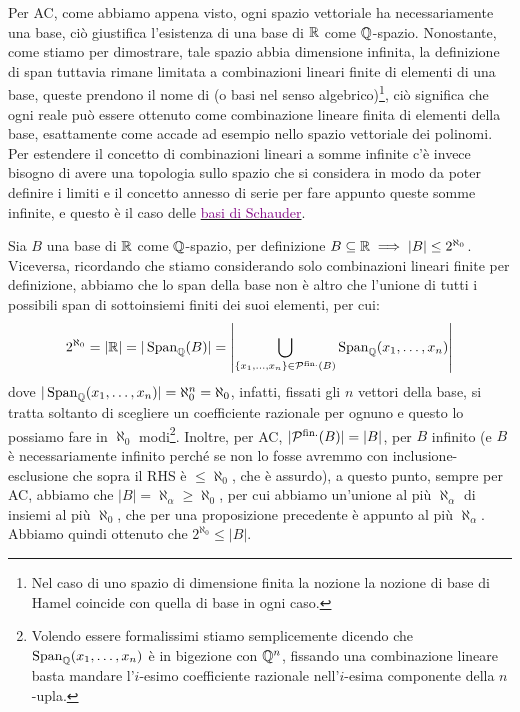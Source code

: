 \begin{remark}
	Per AC, come abbiamo appena visto, ogni spazio vettoriale ha necessariamente una base, ci\`o giustifica l'esistenza di una base di $\mathbb R$ come $\mathbb Q$-spazio. Nonostante, come stiamo per dimostrare, tale spazio abbia dimensione infinita, la definizione di span tuttavia rimane limitata a combinazioni lineari finite di elementi di una base,
	queste prendono il nome di  (o basi nel senso algebrico)\footnote{Nel caso di uno spazio di dimensione finita la nozione la nozione di base di Hamel coincide con quella di base in ogni caso.}, ci\`o significa 
	che ogni reale pu\`o essere ottenuto come combinazione lineare finita di elementi della base, esattamente come accade ad esempio nello spazio vettoriale dei polinomi.\\
	Per estendere il concetto di combinazioni lineari a somme infinite c'\`e invece bisogno di avere una topologia sullo spazio che si considera in modo da poter definire i limiti e il concetto annesso di serie per fare appunto queste somme infinite,
	e questo \`e il caso delle \href{https://en.wikipedia.org/wiki/Schauder_basis}{\textcolor{purple}{basi di Schauder}}.
\end{remark}

\begin{soln}
	Sia $B$ una base di $\mathbb R$ come $\mathbb Q$-spazio, per definizione $B \subseteq \mathbb R \implies |B|\leq 2^{\aleph_0}$. Viceversa, ricordando che stiamo considerando solo combinazioni lineari finite per definizione, abbiamo che lo span della base non \`e altro che l'unione di tutti i possibili span di sottoinsiemi finiti dei suoi elementi, per cui:
	\[  2^{\aleph_0} = |\RR| = |\Span_\QQ(B)| = \left\lvert \bigcup_{\{x_1,\ldots,x_n\} \in \psf(B)} \Span_\QQ(x_1,\ldots,x_n)\right\rvert
		\]
	dove $|\operatorname{Span}_\mathbb Q(x_1,\ldots,x_n)| = \aleph_0^n = \aleph_0$, infatti, fissati gli $n$ vettori della base, si tratta soltanto di scegliere un coefficiente razionale per ognuno e
	questo lo possiamo fare in $\aleph_0$ modi\footnote{Volendo essere formalissimi stiamo semplicemente dicendo che $\operatorname{Span}_\mathbb Q(x_1,\ldots,x_n)$ \`e in bigezione con $\mathbb Q^{n}$, fissando una combinazione lineare basta mandare l’$i$-esimo coefficiente razionale nell'$i$-esima componente della $n$-upla.}.
	Inoltre, per AC, $|\mathcal{P}^{\text{fin.}}(B)| = |B|$, per $B$ infinito (e $B$ \`e necessariamente infinito perch\'e se non lo fosse avremmo con inclusione-esclusione che sopra il RHS \`e $\leq \aleph_0$, che \`e assurdo), a questo punto, sempre per AC, abbiamo che $|B| = \aleph_\alpha \geq \aleph_0$, per cui abbiamo un'unione al pi\`u $\aleph_\alpha$ di insiemi al pi\`u $\aleph_0$, che per una proposizione precedente \`e appunto al pi\`u $\aleph_\alpha$.
	Abbiamo quindi ottenuto che $2^{\aleph_0} \leq |B|$.
\end{soln}

